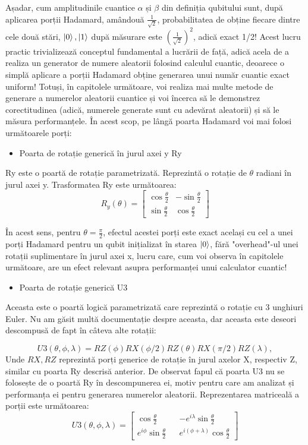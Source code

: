 Așadar, cum amplitudinile cuantice $\alpha$ și $\beta$ din definiția qubitului sunt, după aplicarea porții Hadamard, amândouă $\frac{1}{\sqrt{2}}$, probabilitatea de obține fiecare dintre cele două stări, $\ket{0}, \ket{1}$ după măsurare este $(\frac{1}{\sqrt{2}})^2$, adică exact 1/2! Acest lucru practic trivializează conceptul fundamental a lucrării de față, adică acela de a realiza un generator de numere aleatorii folosind calculul cuantic, deoarece o simplă aplicare a porții Hadamard obține generarea unui număr cuantic exact uniform! Totuși, în capitolele următoare, voi realiza mai multe metode de generare a numerelor aleatorii cuantice și voi încerca să le demonstrez corectitudinea (adică, numerele generate sunt cu adevărat aleatorii) și să le măsura performanțele. În acest scop, pe lângă poarta Hadamard voi mai folosi următoarele porți:

\begin{itemize}
    \item Poarta de rotație generică în jurul axei y Ry
\end{itemize}
Ry este o poartă de rotație parametrizată. Reprezintă o rotație de $\theta$ radiani în jurul axei y. Trasformatea Ry este următoarea:
\[
R_y(\theta) = \begin{bmatrix}
\cos \frac{\theta}{2} & -\sin \frac{\theta}{2} \\
\sin \frac{\theta}{2} & \cos \frac{\theta}{2}
\end{bmatrix}
\]

În acest sens, pentru $\theta = \frac{\pi}{2}$, efectul acestei porți este exact același cu cel a unei porți Hadamard pentru un qubit inițializat în starea $\ket{0}$, fără "overhead"-ul unei rotații suplimentare în jurul axei x, lucru care, cum voi observa în capitolele următoare, are un efect relevant asupra performanței unui calculator cuantic!

\begin{itemize}
    \item Poarta de rotație generică U3
\end{itemize}

Aceasta este o poartă logică parametrizată care reprezintă o rotație cu 3 unghiuri Euler. Nu am găsit multă documentație despre aceasta, dar aceasta este deseori descompusă de fapt în câteva alte rotații:

\[
U3(\theta, \phi, \lambda) = RZ(\phi)RX(\phi/2)RZ(\theta)RX(\pi/2)RZ(\lambda),
\]
Unde $RX, RZ$ reprezintă porți generice de rotație în jurul axelor X, respectiv Z, similar cu poarta Ry descrisă anterior. De observat fapul că poarta U3 nu se folosește de o poartă Ry în descompunerea ei, motiv pentru care am analizat și performanța ei pentru generarea numerelor aleatorii. Reprezentarea matriceală a porții este următoarea:
\[
U3(\theta, \phi, \lambda) = \begin{bmatrix}
\cos\frac{\theta}{2} && -e^{i\lambda} \sin \frac{\theta}{2} \\
e^{i\phi}\sin \frac{\theta}{2} && e^{i(\phi + \lambda)} \cos \frac{\theta}{2}
\end{bmatrix}
\]

